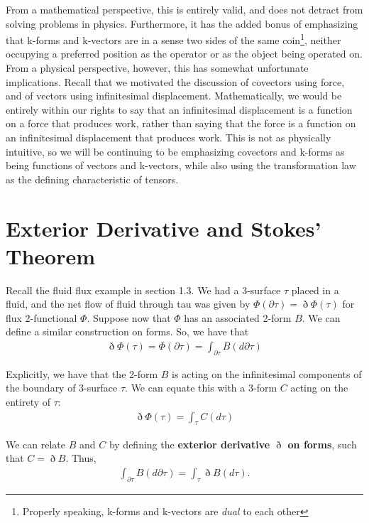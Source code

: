 \documentclass{book}
\begin{document}
From a mathematical perspective, this is entirely valid, and does not detract from solving problems in physics. Furthermore, it has the added bonus of emphasizing that k-forms and k-vectors are in a sense two sides of the same coin\footnote{Properly speaking, k-forms and k-vectors are \emph{dual} to each other}, neither occupying a preferred position as the operator or as the object being operated on. From a physical perspective, however, this has somewhat unfortunate implications. Recall that we motivated the discussion of covectors using force, and of vectors using infinitesimal displacement. Mathematically, we would be entirely within our rights to say that an infinitesimal displacement is a function on a force that produces work, rather than saying that the force is a function on an infinitesimal displacement that produces work. This is not as physically intuitive, so we will be continuing to be emphasizing covectors and k-forms as being functions of vectors and k-vectors, while also using the transformation law as the defining characteristic of tensors.



\section{Exterior Derivative and Stokes' Theorem}


Recall the fluid flux example in section 1.3. We had a 3-surface $\tau$ placed in a fluid, and the net flow of fluid through tau was given by $\Phi(\partial\tau) = \eth\Phi(\tau)$ for flux 2-functional $\Phi$. Suppose now that $\Phi$ has an associated 2-form $B$. We can define a similar construction on forms. So, we have that \begin{gather} \eth\Phi(\tau) = \Phi(\partial\tau) = \int_{\partial\tau} B(d\partial\tau) \end{gather}

Explicitly, we have that the 2-form $B$ is acting on the infinitesimal components of the boundary of 3-surface $\tau$. We can equate this with a 3-form $C$ acting on the entirety of $\tau$: \begin{gather} \eth\Phi(\tau) = \int_\tau C(d\tau) \end{gather}

We can relate $B$ and $C$ by defining the \textbf{exterior derivative $\eth$ on forms}, such that $C = \eth B$. Thus, \begin{gather} \int_{\partial\tau} B(d\partial\tau) = \int_\tau \eth B(d\tau). \end{gather}
\end{document}
